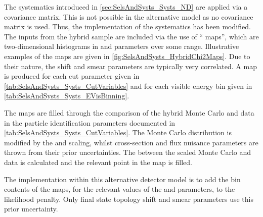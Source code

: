The  systematics introduced in \autoref{sec:SelsAndSysts_Systs_ND} are applied via a covariance matrix. This is not possible in the alternative model as no covariance matrix is used. Thus, the implementation of the  systematics has been modified. The inputs from the hybrid  sample are included via the use of `` maps'', which are two-dimensional histograms in  and  parameters over some range. Illustrative examples of the  maps are given in \autoref{fig:SelsAndSysts_HybridChi2Maps}. Due to their nature, the shift and smear parameters are typically very correlated. A map is produced for each cut parameter given in \autoref{tab:SelsAndSysts_Systs_CutVariables} and for each visible energy bin given in \autoref{tab:SelsAndSysts_Systs_EVisBinning}.

The maps are filled through the  comparison of the hybrid  Monte Carlo and data in the particle identification parameters documented in \autoref{tab:SelsAndSysts_Systs_CutVariables}. The Monte Carlo distribution is modified by the  and  scaling, whilst cross-section and flux nuisance parameters are thrown from their prior uncertainties. The  between the scaled Monte Carlo and data is calculated and the relevant point in the  map is filled.

The implementation within this alternative detector model is to add the bin contents of the maps, for the relevant values of the  and  parameters, to the likelihood penalty. Only  final state topology shift and smear parameters use this prior uncertainty. 

